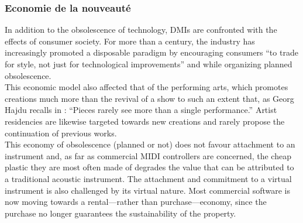 \subsubsection{Economie de la nouveauté}
In addition to the obsolescence of technology, DMIs are confronted with the effects of consumer society. For more than a century, the industry has increasingly promoted a disposable paradigm by encouraging consumers “to trade for style, not just for technological improvements” \cite{slade_made_2006} and while organizing planned obsolescence.\\
\indent This economic model also affected that of the performing arts, which promotes creations much more than the revival of a show to such an extent that, as Georg Hajdu recalls in \cite{hajdu_disposable_2016}: “Pieces rarely see more than a single performance.” Artist residencies are likewise targeted towards new creations and rarely propose the continuation of previous works.\\
\indent This economy of obsolescence (planned or not) does not favour attachment to an instrument and, as far as commercial MIDI controllers are concerned, the cheap plastic they are most often made of degrades the value that can be attributed to a traditional acoustic instrument. The attachment and commitment to a virtual instrument is also challenged by its virtual nature. Most commercial software is now moving towards a rental—rather than purchase—economy, since the purchase no longer guarantees the sustainability of the property.
	
